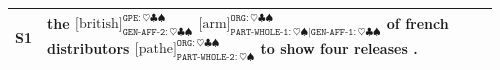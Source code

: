 \begin{table}
    \centering
    \renewcommand{\multirowsetup}{\centering}  
    \label{tab:err-1}
    \begin{tabular}{p{0.06\linewidth}|p{0.9\linewidth}}
        \toprule
        S1 & %
        the 
        $\text{[british]}_{\texttt{GEN-AFF-2}: \heartsuit \clubsuit  \spadesuit}^{\texttt{GPE}:\heartsuit \clubsuit \spadesuit}$
        $\text{[arm]}_{\texttt{PART-WHOLE-1}: \heartsuit \spadesuit | \texttt{GEN-AFF-1}: \heartsuit \clubsuit \spadesuit}^{\texttt{ORG}:\heartsuit \clubsuit \spadesuit}$
        of french distributors 
        $\text{[pathe]}_{\texttt{PART-WHOLE-2}: \heartsuit \spadesuit}^{\texttt{ORG}:\heartsuit \clubsuit \spadesuit}$
        to show four releases . 
        \\
        \bottomrule
    \end{tabular}
    

\end{table}

